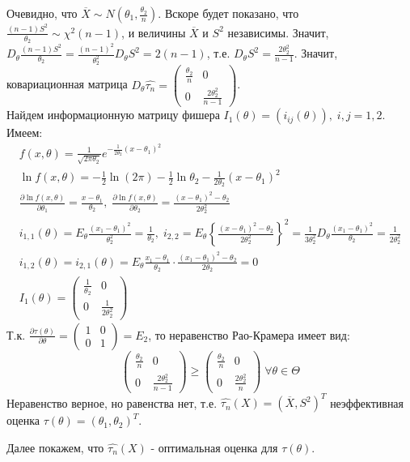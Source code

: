 Очевидно, что $\overline{X} \sim N(\theta_1, \frac{\theta_2}{n})$. Вскоре будет показано, что $\frac{(n-1)S^2}{\theta_2} \sim \chi^2 (n-1)$, и величины $\overline{X}$ и $S^2$ независимы. Значит, $D_{\theta} \frac{(n-1) S^2}{\theta_2} = \frac{(n-1)^2}{\theta_2^2} D_{\theta} S^2 = 2(n-1)$, т.е. $D_{\theta} S^2 = \frac{2 \theta_2^2}{n-1}$. Значит, ковариационная матрица $D_{\theta} \hat{\tau_n} = \begin{pmatrix}
	\frac{\theta_2}{n} & 0 \\
	0 & \frac{2 \theta_2^2}{n-1}
\end{pmatrix}$.\\
Найдем информационную матрицу фишера $I_1 (\theta) = (i_{ij} (\theta)), \; i,j = 1,2$. Имеем:
$$\begin{gathered}
	f(x, \theta) = \frac{1}{\sqrt{2 \pi \theta_2}} e^{-\frac{1}{2 \theta_2} (x - \theta_1)^2} \\
	\ln f(x, \theta) = - \frac{1}{2} \ln (2 \pi) - \frac{1}{2} \ln \theta_2 - \frac{1}{2 \theta_2} (x - \theta_1)^2 \\
	\frac{\partial \ln f(x, \theta)}{\partial \theta_1} = \frac{x - \theta_1}{\theta_2}, \; \frac{\partial \ln f(x, \theta)}{\partial \theta_2} = \frac{(x - \theta_1)^2 - \theta_2}{2\theta_2^2}\\
	i_{1,1}(\theta) = E_{\theta} \frac{(x_1 - \theta_1)^2}{\theta_2^2} = \frac{1}{\theta_2}, \; i_{2,2} = E_{\theta} \left\{ \frac{(x - \theta_1)^2 - \theta_2}{2\theta_2^2} \right\}^2 = \frac{1}{3 \theta_2^2} D_{\theta} \frac{(x_1 - \theta_1)^2}{\theta_2} = \frac{1}{2 \theta_2^2} \\
	i_{1,2}(\theta) = i_{2,1}(\theta) = E_{\theta} \frac{x_1 - \theta_1}{\theta_2} \cdot \frac{(x_1 - \theta_1)^2 - \theta_2}{2 \theta_2} = 0 \\
	I_1 (\theta) = \begin{pmatrix}
		\frac{1}{\theta_2} & 0 \\
		0 & \frac{1}{2 \theta_2^2}
	\end{pmatrix}
\end{gathered}$$
Т.к. $\frac{\partial \tau (\theta)}{\partial \theta} = \begin{pmatrix}
	1 & 0 \\ 0 & 1
\end{pmatrix} = E_2$, то неравенство Рао-Крамера имеет вид:
$$\begin{pmatrix}
	\frac{\theta_2}{n} & 0 \\
	0 & \frac{2 \theta_2^2}{n-1}
\end{pmatrix} \ge \begin{pmatrix}
	\frac{\theta_2}{n} & 0 \\
	0 & \frac{2 \theta_2^2}{n}
\end{pmatrix} \; \forall \theta \in \Theta$$
Неравенство верное, но равенства нет, т.е. $\hat{\tau_n}(X) = (\overline{X}, S^2)^T$ неэффективная оценка $\tau (\theta) = (\theta_1, \theta_2)^T$.

Далее покажем, что $\hat{\tau_n}(X)$ - оптимальная оценка для $\tau (\theta)$.

















